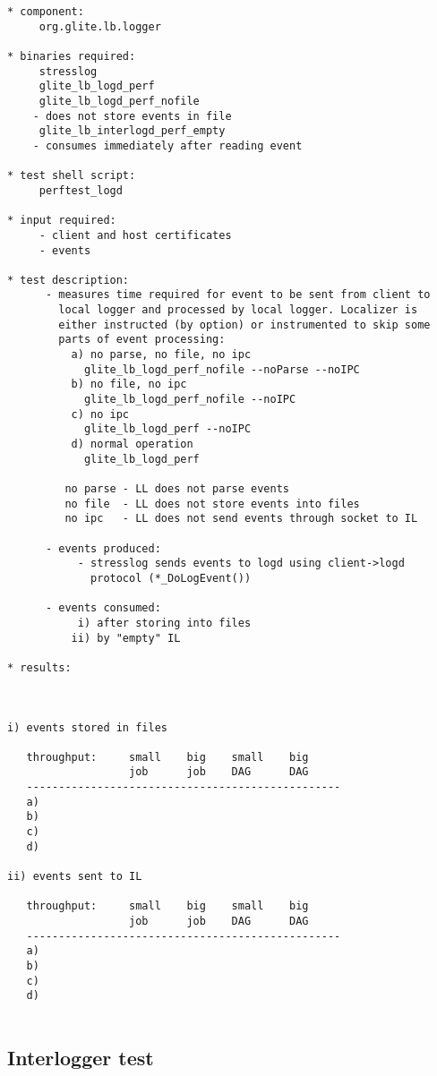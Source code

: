 \begin{verbatim}
* component:
     org.glite.lb.logger

* binaries required:
     stresslog
     glite_lb_logd_perf
     glite_lb_logd_perf_nofile
	- does not store events in file
     glite_lb_interlogd_perf_empty
	- consumes immediately after reading event

* test shell script:
     perftest_logd

* input required:
     - client and host certificates
     - events

* test description:
      - measures time required for event to be sent from client to
        local logger and processed by local logger. Localizer is
        either instructed (by option) or instrumented to skip some
        parts of event processing:
	      a) no parse, no file, no ipc
		    glite_lb_logd_perf_nofile --noParse --noIPC
	      b) no file, no ipc
		    glite_lb_logd_perf_nofile --noIPC
	      c) no ipc
		    glite_lb_logd_perf --noIPC
	      d) normal operation
		    glite_lb_logd_perf

         no parse - LL does not parse events
         no file  - LL does not store events into files
         no ipc   - LL does not send events through socket to IL

      - events produced:
           - stresslog sends events to logd using client->logd
             protocol (*_DoLogEvent())

      - events consumed:
           i) after storing into files
          ii) by "empty" IL

* results:



i) events stored in files

   throughput:     small    big    small    big
                   job      job    DAG      DAG
   -------------------------------------------------
   a)
   b)
   c)
   d)

ii) events sent to IL

   throughput:     small    big    small    big
                   job      job    DAG      DAG
   -------------------------------------------------
   a)
   b)
   c)
   d)


\end{verbatim}

\subsection{Interlogger test}


